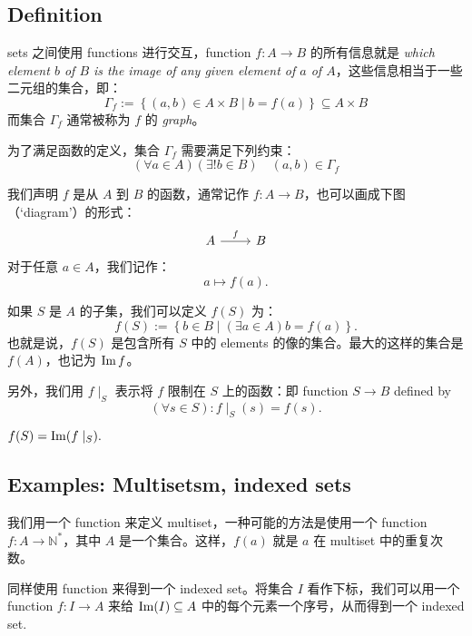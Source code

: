 \subsection{Definition}\label{sec:1.2.1}

sets 之间使用 functions 进行交互，function \(f : A \to B\) 的所有信息就是 \emph{which element \(b\) of \(B\) is the image of any given element of \(a\) of \(A\)}，这些信息相当于一些二元组的集合，即：
\[\Gamma_f := \left\{ \left(a, b\right) \in A \times B \mid b = f(a) \right\} \subseteq A \times B \]
而集合 \(\Gamma_f\) 通常被称为 \(f\) 的 \emph{graph}。

为了满足函数的定义，集合 \(\Gamma_f\) 需要满足下列约束：
\[\left(\forall a \in A\right)\left(\exists! b \in B\right) \quad \left(a, b\right) \in \Gamma_f\]

我们声明 \(f\) 是从 \(A\) 到 \(B\) 的函数，通常记作 \(f : A \to B\)，也可以画成下图（`diagram'）的形式：
\[\begin{tikzcd}
        A & B
        \arrow["f", from=1-1, to=1-2]
    \end{tikzcd}\]
对于任意 \(a \in A\)，我们记作：
\[a \mapsto f(a).\]

如果 \(S\) 是 \(A\) 的子集，我们可以定义 \(f(S)\) 为：
\[f(S) := \left\{ b \in B \mid \left( \exists a \in A\right) b = f(a)\right\}.\]
也就是说，\(f(S)\) 是包含所有 \(S\) 中的 elements 的像的集合。最大的这样的集合是 \(f(A)\)，也记为 \(\operatorname{Im} f\)。

另外，我们用 \(f\mid_S\) 表示将 \(f\) 限制在 \(S\) 上的函数：即 function \(S \to B\) defined by
\[\left( \forall s \in S\right): f\mid_S (s) = f(s).\]
\begin{note}
    \(f(S) = \operatorname{Im}(f\mid_S).\)
\end{note}

\subsection{Examples: Multisetsm, indexed sets}\label{sec:1.2.2}

\begin{eg}[Multiset]
    我们用一个 function 来定义 multiset，一种可能的方法是使用一个 function \(f : A \to \mathbb{N}^{*}\)，其中 \(A\) 是一个集合。这样，\(f(a)\) 就是 \(a\) 在 multiset 中的重复次数。
\end{eg}
\begin{eg}
    同样使用 function 来得到一个 indexed set。将集合 \(I\) 看作下标，我们可以用一个 function \(f : I \to A\) 来给 \(\operatorname{Im}(I) \subseteq A\) 中的每个元素一个序号，从而得到一个 indexed set.
\end{eg}

